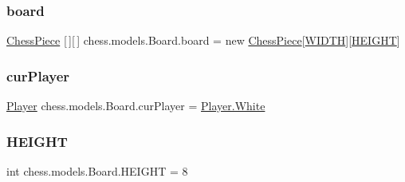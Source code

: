 \mbox{\label{classchess_1_1models_1_1_board_a3437f7249afab8766357c12a2da2dbab}} 
\subsubsection{\texorpdfstring{board}{board}}
{\footnotesize\ttfamily \mbox{\hyperlink{classchess_1_1models_1_1_chess_piece}{Chess\+Piece}} \mbox{[}$\,$\mbox{]}\mbox{[}$\,$\mbox{]} chess.\+models.\+Board.\+board = new \mbox{\hyperlink{classchess_1_1models_1_1_chess_piece}{Chess\+Piece}}\mbox{[}\mbox{\hyperlink{classchess_1_1models_1_1_board_a87cf88fb8e9e53ae787791cbd114cb33}{W\+I\+D\+TH}}\mbox{]}\mbox{[}\mbox{\hyperlink{classchess_1_1models_1_1_board_a4abda6f2d6518bacfbfed46214ad9507}{H\+E\+I\+G\+HT}}\mbox{]}\hspace{0.3cm}{\ttfamily [private]}}

\mbox{\label{classchess_1_1models_1_1_board_ac1b409757f5ecc1de2e00b6b92ca6605}} 
\subsubsection{\texorpdfstring{cur\+Player}{curPlayer}}
{\footnotesize\ttfamily \mbox{\hyperlink{enumchess_1_1models_1_1enums_1_1_player}{Player}} chess.\+models.\+Board.\+cur\+Player = \mbox{\hyperlink{enumchess_1_1models_1_1enums_1_1_player_a60ced79fc80ec46a6a2a6f031b27b08e}{Player.\+White}}\hspace{0.3cm}{\ttfamily [private]}}

\mbox{\label{classchess_1_1models_1_1_board_a4abda6f2d6518bacfbfed46214ad9507}} 
\subsubsection{\texorpdfstring{H\+E\+I\+G\+HT}{HEIGHT}}
{\footnotesize\ttfamily int chess.\+models.\+Board.\+H\+E\+I\+G\+HT = 8\hspace{0.3cm}{\ttfamily [private]}}

